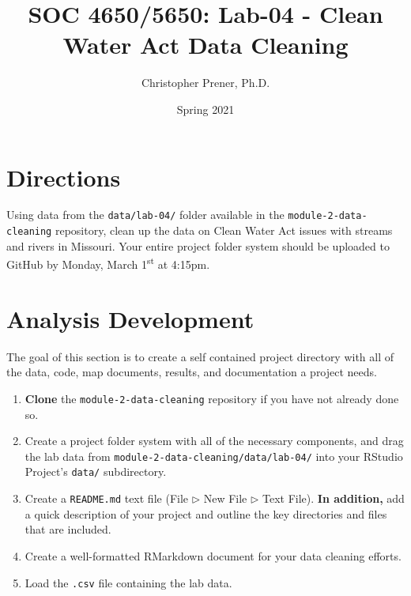 \documentclass{tufte-handout}
\title{SOC 4650/5650: Lab-04 - Clean Water Act Data Cleaning}
\author{Christopher Prener, Ph.D.}
\date{Spring 2021}
\begin{document}
\maketitle %

\section{Directions}
Using data from the \texttt{data/lab-04/} folder available in the \texttt{module-2-data-cleaning} repository, clean up the data on Clean Water Act issues with streams and rivers in Missouri. Your entire project folder system should be uploaded to GitHub by Monday, March 1\textsuperscript{st} at 4:15pm.

\vspace{5mm}
\section{Analysis Development}
The goal of this section is to create a self contained project directory with all of the data, code, map documents, results, and documentation a project needs.

\begin{enumerate}[label=\alph*.]
\item \textbf{Clone} the \texttt{module-2-data-cleaning} repository if you have not already done so.
\item Create a project folder system with all of the necessary components, and drag the lab data from \texttt{module-2-data-cleaning/data/lab-04/} into your RStudio Project's \texttt{data/} subdirectory.
\item Create a \texttt{README.md} text file (\textsf{File $\triangleright$} {\color{red}\textsf{New File}} \textsf{$\triangleright$ Text File}). \textbf{In addition,} add a quick description of your project and outline the key directories and files that are included.
\item Create a well-formatted RMarkdown document for your data cleaning efforts.
\item Load the \texttt{.csv} file containing the lab data.
\end{enumerate}

\vspace{5mm}
\end{document}
